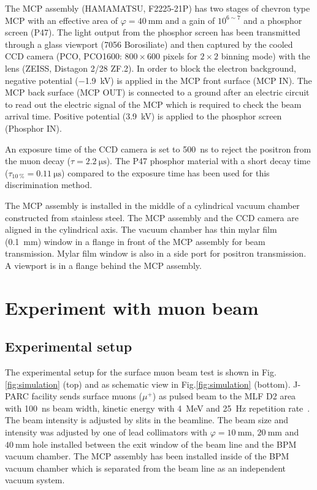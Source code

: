 \documentclass[preprint,3p,twocolumn]{elsarticle}
\begin{document}
The MCP assembly (HAMAMATSU, F2225-21P) has two stages of chevron type MCP with an effective area of $\varphi = \SI{40}{\mm}$ and a gain of $10^{6\sim7}$ and a phosphor screen (P47). The light output from the phosphor screen has been transmitted through a glass viewport (7056 Borosiliate) and then captured by the cooled CCD camera (PCO, PCO1600: $800 \times 600$ pixels for $2 \times 2$ binning mode) with the lens (ZEISS, Distagon 2/28 ZF.2). 
In order to block the electron background, negative potential (\SI{-1.9}{\kilo\volt}) is applied in the MCP front surface (MCP IN).
The MCP back surface (MCP OUT) is connected to a ground after an electric circuit to read out the electric signal of the MCP which is required to check the beam arrival time.
Positive potential (\SI{3.9}{\kilo\volt}) is applied to the phosphor screen (Phosphor IN).

An exposure time of the CCD camera is set to \SI{500}{\nano\s} to reject the positron from the muon decay ($\tau = \SI{2.2}{\micro\s}$).
The P47 phosphor material with a short decay time ($\tau_{\SI{10}{\percent}} = \SI{0.11}{\micro\s}$) compared to the exposure time has been used for this discrimination method.

The MCP assembly is installed in the middle of a cylindrical vacuum chamber constructed from stainless steel.
The MCP assembly and the CCD camera are aligned in the cylindrical axis.
The vacuum chamber has thin mylar film (\SI{0.1}{mm}) window in a flange in front of the MCP assembly for beam transmission.
Mylar film window is also in a side port for positron transmission. 
A viewport is in a flange behind the MCP assembly.

\section{Experiment with muon beam}

\subsection{Experimental setup} 

The experimental setup for the surface muon beam test is shown in Fig.\ref{fig:simulation} {(top)} and as schematic view in Fig.\ref{fig:simulation} {(bottom)}.
J-PARC facility sends surface muons ($\mu^{+}$) as pulsed beam to the MLF D2 area with \SI{100}{\nano\s} beam width, kinetic energy with \SI{4}{\MeV} and \SI{25}{\hertz} repetition rate~\cite{D-line, D-line1}.
The beam intensity is adjusted by slits in the beamline.
The beam size and intensity was adjusted by one of lead collimators with $\varphi=\SI{10}{\mm}$, $\SI{20}{\mm}$ and $\SI{40}{\mm}$ hole installed between the exit window of the beam line and the BPM vacuum chamber.
The MCP assembly has been installed inside of the BPM vacuum chamber which is separated from the beam line as an independent vacuum system.
\end{document}
